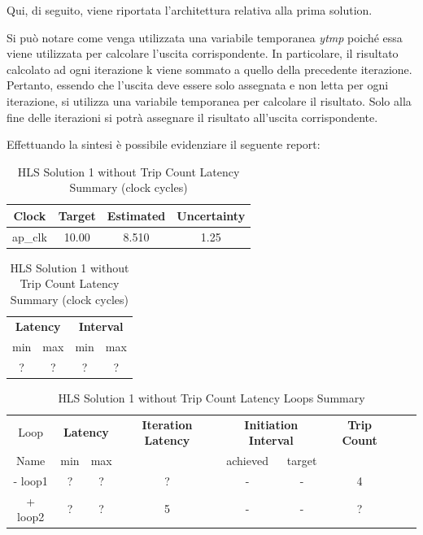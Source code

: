 Qui, di seguito, viene riportata l'architettura relativa alla prima solution. 



Si può notare come venga utilizzata una variabile temporanea \textit{ytmp} poiché essa viene utilizzata per calcolare l'uscita corrispondente. In particolare, il risultato calcolato ad ogni iterazione k viene sommato a quello della precedente iterazione. Pertanto, essendo che l'uscita deve essere solo assegnata e non letta per ogni iterazione, si utilizza una variabile temporanea per calcolare il risultato. Solo alla fine delle iterazioni si potrà assegnare il risultato all'uscita corrispondente. 

Effettuando la sintesi è possibile evidenziare il seguente report:\\
\begin{table}[H]
	\centering
	\begin{minipage}[t]{0.45\linewidth}
		\centering
		\begin{tabular}{|c|c|c|c|}
			\hline
			\textbf{Clock} & \textbf{Target} & \textbf{Estimated} & \textbf{Uncertainty} \\
			\hline
			ap\_clk & 10.00 & 8.510 & 1.25 \\
			\hline
		\end{tabular}
		\caption{HLS Solution 1 without Trip Count Timing Summary (ns)}
		\label{tab:hls-solution-1-timing-summary}
	\end{minipage}
	\hfill
	\begin{minipage}[t]{0.45\linewidth}
		\centering
		\begin{tabular}{|c|c|c|c|}
			\hline
			\multicolumn{2}{|c|}{\textbf{Latency}} & \multicolumn{2}{|c|}{\textbf{Interval}} \\
			min & max & min & max \\
			\hline
			? & ? & ? & ? \\
			\hline
		\end{tabular}
		\caption{HLS Solution 1 without Trip Count Latency Summary (clock cycles)}
		\label{tab:hls-solution-1-latency-summary}
	\end{minipage}
\end{table}

\begin{table}[H]
	\centering
	\begin{tabular}{|c|c|c|c|c|c|c|c|c|}
		\hline
		\multicolumn{1}{|c|}{Loop} & \multicolumn{2}{|c|}{\textbf{Latency}} & \multicolumn{1}{c|}{\textbf{Iteration Latency}} & \multicolumn{2}{c|}{\textbf{Initiation Interval}} & \multicolumn{1}{c|}{\textbf{Trip Count}}  \\
		Name & min & max &  & achieved & target &  \\
		\hline
		- loop1 & ? & ? & ? & - & - & 4 \\
		+ loop2 & ? & ? & 5 & - & - & ? \\
		\hline
	\end{tabular}
	\caption{HLS Solution 1 without Trip Count Latency Loops Summary}
	\label{tab:hls-solution-1-loop-summary}
\end{table}

